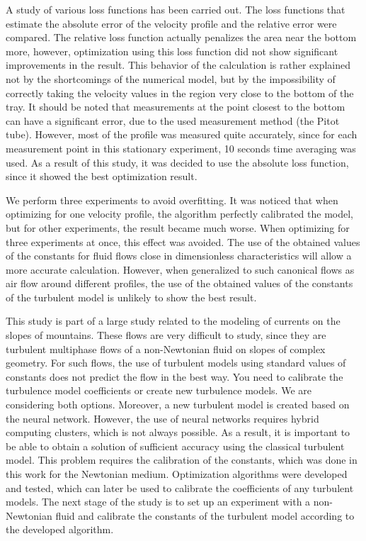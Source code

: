 \documentclass[mathematics,article,submit,pdftex,moreauthors]{Definitions/mdpi}
\begin{document}
A study of various loss functions has been carried out. The loss functions that estimate the absolute error of the velocity profile and the relative error were compared. The relative loss function actually penalizes the area near the bottom more, however, optimization using this loss function did not show significant improvements in the result. This behavior of the calculation is rather explained not by the shortcomings of the numerical model, but by the impossibility of correctly taking the velocity values in the region very close to the bottom of the tray. It should be noted that measurements at the point closest to the bottom can have a significant error, due to the used measurement method (the Pitot tube). However, most of the profile was measured quite accurately, since for each measurement point in this stationary experiment, 10 seconds time averaging was used. As a result of this study, it was decided to use the absolute loss function, since it showed the best optimization result.

We perform three experiments to avoid overfitting. It was noticed that when optimizing for one velocity profile, the algorithm perfectly calibrated the model, but for other experiments, the result became much worse. When optimizing for three experiments at once, this effect was avoided. The use of the obtained values of the constants for fluid flows close in dimensionless characteristics will allow a more accurate calculation. However, when generalized to such canonical flows as air flow around different profiles, the use of the obtained values of the constants of the turbulent model is unlikely to show the best result.

This study is part of a large study related to the modeling of currents on the slopes of mountains. These flows are very difficult to study, since they are turbulent multiphase flows of a non-Newtonian fluid on slopes of complex geometry. For such flows, the use of turbulent models using standard values of constants does not predict the flow in the best way. You need to calibrate the turbulence model coefficients or create new turbulence models. We are considering both options. Moreover, a new turbulent model is created based on the neural network. However, the use of neural networks requires hybrid computing clusters, which is not always possible. As a result, it is important to be able to obtain a solution of sufficient accuracy using the classical turbulent model. This problem requires the calibration of the constants, which was done in this work for the Newtonian medium. Optimization algorithms were developed and tested, which can later be used to calibrate the coefficients of any turbulent models. The next stage of the study is to set up an experiment with a non-Newtonian fluid and calibrate the constants of the turbulent model according to the developed algorithm.
\end{document}
